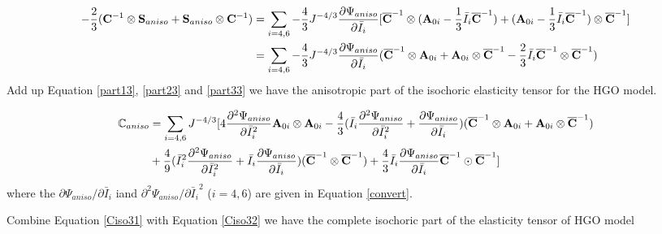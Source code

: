 \begin{equation} \label{part33}
\begin{split}
-\frac{2}{3}(\bold{C}^{-1} \otimes \bold{S}_{aniso} + \bold{S}_{aniso} \otimes \bold{C}^{-1}) &=
\sum_{i = 4, 6} -\frac{4}{3}J^{-4/3}\frac{\partial\Psi_{aniso}}{\partial\bar{I}_i}
[\overline{\bold{C}}^{-1} \otimes (\bold{A}_{0i} - \frac{1}{3}\bar{I}_i \overline{\bold{C}}^{-1})
+ (\bold{A}_{0i} - \frac{1}{3}\bar{I}_i \overline{\bold{C}}^{-1}) \otimes \overline{\bold{C}}^{-1}] \\
&= \sum_{i = 4, 6} -\frac{4}{3}J^{-4/3}\frac{\partial\Psi_{aniso}}{\partial\bar{I}_i}
(\overline{\bold{C}}^{-1} \otimes \bold{A}_{0i} + \bold{A}_{0i} \otimes \overline{\bold{C}}^{-1} 
- \frac{2}{3} \bar{I}_i \overline{\bold{C}}^{-1} \otimes \overline{\bold{C}}^{-1}) \\
\end{split}
\end{equation}
Add up Equation \ref{part13}, \ref{part23} and \ref{part33} we have the anisotropic part of the isochoric elasticity tensor for the HGO model.

\begin{equation} \label{Ciso31}
\begin{split}
\mathbb{C}_{aniso} 
&= \sum_{i = 4, 6} J^{-4/3}[4\frac{\partial^2\Psi_{aniso}}{\partial{\bar{I}_i}^2} \bold{A}_{0i} \otimes \bold{A}_{0i} - \frac{4}{3}(\bar{I}_i\frac{\partial^2\Psi_{aniso}}{\partial{\bar{I}_i}^2} + \frac{\partial\Psi_{aniso}}{\partial{\bar{I}_i}})(\overline{\bold{C}}^{-1} \otimes \bold{A}_{0i} + \bold{A}_{0i} \otimes \overline{\bold{C}}^{-1}) \\
&+ \frac{4}{9}({\bar{I}_i}^2\frac{\partial^2\Psi_{aniso}}{\partial{\bar{I}_i}^2} + \bar{I}_i\frac{\partial\Psi_{aniso}}{\partial{\bar{I}_i}})(\overline{\bold{C}}^{-1} \otimes \overline{\bold{C}}^{-1}) 
+ \frac{4}{3}\bar{I}_i \frac{\partial\Psi_{aniso}}{\partial{\bar{I}_i}} \overline{\bold{C}}^{-1} \odot \overline{\bold{C}}^{-1}]
\end{split}
\end{equation}
where the $\partial\Psi_{aniso}/\partial{\bar{I}_i}$ iand $\partial^2\Psi_{aniso}/{\partial{\bar{I}_i}^2}$ ($i = 4, 6$) are given in Equation \ref{convert}.

Combine Equation \ref{Ciso31} with Equation \ref{Ciso32} we have the complete isochoric part of the elasticity tensor of HGO model

